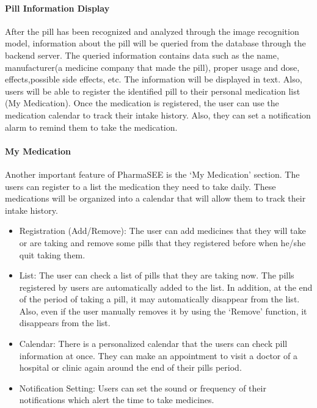 \documentclass[conference]{IEEEtran}
\begin{document}
\paragraph{Pill Information Display}After the pill has been recognized and analyzed through the image recognition model, information about the pill will be queried from the database through the backend server. The queried information contains data such as the name, manufacturer(a medicine company that made the pill), proper usage and dose, effects,possible side effects, etc. The information will be displayed in text. Also, users will be able to register the identified pill to their personal medication list (My Medication). Once the medication is registered, the user can use the medication calendar to track their intake history. Also, they can set a notification alarm to remind them to take the medication.\\

\paragraph{My Medication}Another important feature of PharmaSEE is the ‘My Medication’ section. The users can register to a list the medication they need to take daily. These medications will be organized into a calendar that will allow them to track their intake history.\\

\begin{itemize}
\item Registration (Add/Remove): The user can add medicines that they will take or are taking and remove some pills that they registered before when he/she quit taking them. \\

\item List: The user can check a list of pills that they are taking now. The pills registered by users are automatically added to the list. In addition, at the end of the period of taking a pill, it may automatically disappear from the list. Also, even if the user manually removes it by using the ‘Remove’ function, it disappears from the list.\\ 

\item Calendar: There is a personalized calendar that the users can check pill information at once. They can make an appointment to visit a doctor of a hospital or clinic again around the end of their pills period.\\

\item Notification Setting: Users can set the sound or frequency of their notifications which alert the time to take medicines.\\
\end{itemize}
\end{document}
